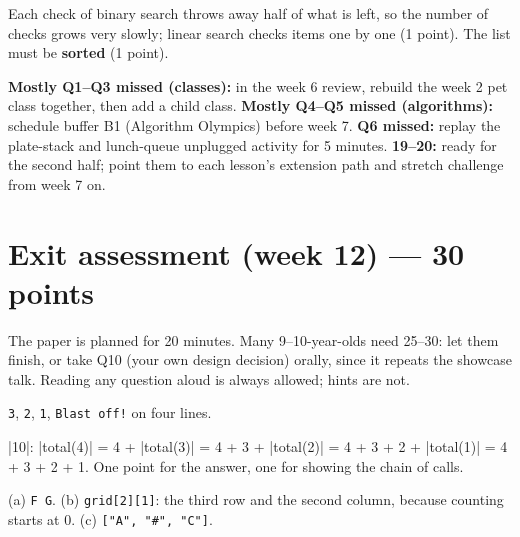 \begin{answer}
Each check of binary search throws away half of what is left, so the number of checks grows very
slowly; linear search checks items one by one (1 point). The list must be \textbf{sorted} (1 point).
\end{answer}

\begin{rubric}
\textbf{Mostly Q1--Q3 missed (classes):} in the week 6 review, rebuild the week 2 pet class
together, then add a child class. \textbf{Mostly Q4--Q5 missed (algorithms):} schedule buffer B1
(Algorithm Olympics) before week 7. \textbf{Q6 missed:} replay the plate-stack and lunch-queue
unplugged activity for 5 minutes. \textbf{19--20:} ready for the second half; point them to each lesson's extension path and
stretch challenge from week 7 on.
\end{rubric}

\section{Exit assessment (week 12) --- 30 points}

\begin{teachernote}
The paper is planned for 20 minutes. Many 9--10-year-olds need 25--30: let them finish, or take
Q10 (your own design decision) orally, since it repeats the showcase talk. Reading any question
aloud is always allowed; hints are not.
\end{teachernote}

\begin{answer}
\texttt{3}, \texttt{2}, \texttt{1}, \texttt{Blast off!} on four lines.
\end{answer}

\begin{answer}
\py|10|: \py|total(4)| = 4 + \py|total(3)| = 4 + 3 + \py|total(2)| = 4 + 3 + 2 + \py|total(1)| =
4 + 3 + 2 + 1. One point for the answer, one for showing the chain of calls.
\end{answer}

\begin{answer}
(a) \texttt{F G}. (b) \texttt{grid[2][1]}: the third row and the second column, because counting starts at 0. (c)
\texttt{["A", "\#", "C"]}.
\end{answer}

